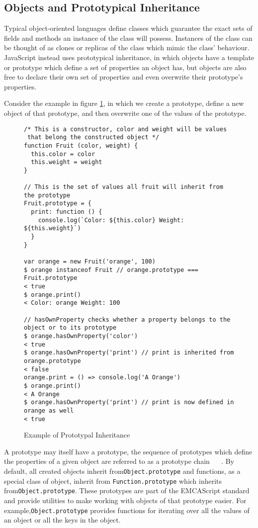 \documentclass[]{final_report}
\begin{document}
\subsection{Objects and Prototypical Inheritance}
Typical object-oriented languages define classes which guarantee the exact sets of fields and methods an instance of the class will possess. Instances of the class can be thought of as clones or replicas of the class which mimic the class' behaviour. JavaScript instead uses prototypical inheritance, in which objects have a template or prototype which define a set of properties an object has, but objects are also free to declare their own set of properties and even overwrite their prototype's properties. 

Consider the example in figure \ref{fig:js-prototypical-inheritance}, in which we create a prototype, define a new object of that prototype, and then overwrite one of the values of the prototype.

\begin{figure}[h]
\begin{verbatim}
/* This is a constructor, color and weight will be values
 that belong the constructed object */
function Fruit (color, weight) {
  this.color = color
  this.weight = weight
}

// This is the set of values all fruit will inherit from the prototype
Fruit.prototype = {
  print: function () {
    console.log(`Color: ${this.color} Weight: ${this.weight}`)
  }
}

var orange = new Fruit('orange', 100)
$ orange instanceof Fruit // orange.prototype === Fruit.prototype
< true
$ orange.print()
< Color: orange Weight: 100

// hasOwnProperty checks whether a property belongs to the object or to its prototype
$ orange.hasOwnProperty('color') 
< true
$ orange.hasOwnProperty('print') // print is inherited from orange.prototype
< false
orange.print = () => console.log('A Orange')
$ orange.print()
< A Orange
$ orange.hasOwnProperty('print') // print is now defined in orange as well
< true
\end{verbatim}
\caption{\label{fig:js-prototypical-inheritance} Example of Prototypal Inheritance}
\end{figure} 

A prototype may itself have a prototype, the sequence of prototypes which define the properties of a given object are referred to as a prototype chain ~\cite{EcmaScript}~ \cite{borning1986classes}.  By default, all created objects inherit from\lstinline{Object.prototype} and functions, as a special class of object, inherit from \lstinline{Function.prototype} which inherits from\lstinline{Object.prototype}. These prototypes are part of the EMCAScript standard and provide utilities to make working with objects of that prototype easier. For example,\lstinline{Object.prototype} provides functions for iterating over all the values of an object or all the keys in the object.
\end{document}
